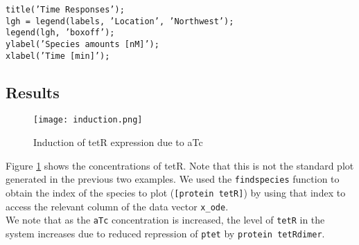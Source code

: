 \noindent \texttt{title('Time Responses');}\\
\texttt{lgh = legend(labels, 'Location', 'Northwest');}\\
\texttt{legend(lgh, 'boxoff');}\\
\texttt{ylabel('Species amounts [nM]');}\\
\texttt{xlabel('Time [min]');}

		
		
		\subsection{Results}	
		\begin{figure}
		\begin{center}
		\texttt{[image: induction.png]} 
		\caption{Induction of tetR expression due to aTc}
		\label{fig:induction}
		\end{center}
		
		\end{figure}
		Figure \ref{fig:induction} shows the concentrations of tetR. Note that this is not the standard plot generated in the previous two examples. We used the \texttt{findspecies} function to obtain the index of the species to plot (\texttt{[protein tetR]}) by using that index to access the relevant column of the data vector \texttt{x\_ode}. \\
		
		We note that as the \texttt{aTc} concentration is increased, the level of \texttt{tetR} in the system increases due to reduced repression of \texttt{ptet} by \texttt{protein tetRdimer}. 
		
